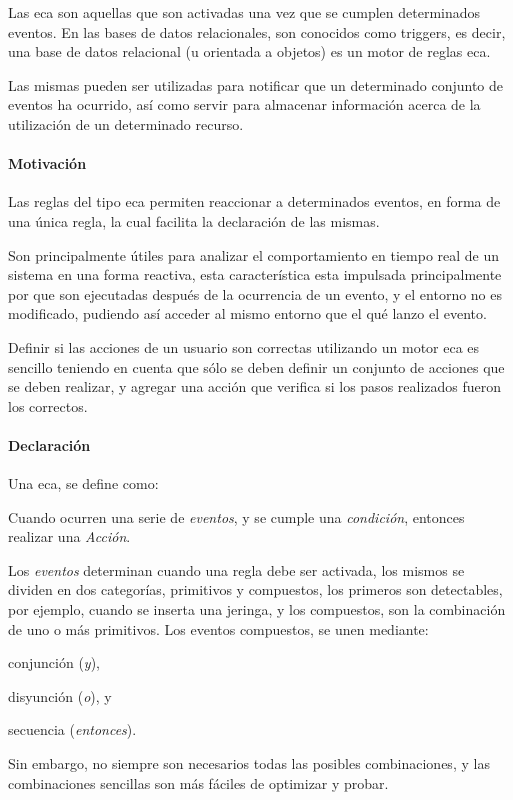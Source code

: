 Las \gls{eca} son aquellas que son activadas una vez que se cumplen determinados
eventos\cite{bailey2004event}. En las bases de datos relacionales, son conocidos
como triggers, es decir, una base de datos relacional (u orientada a objetos) es
un motor de reglas \gls{eca}\cite{bailey2004event,behrends2006combining}.

Las mismas pueden ser utilizadas para notificar que un determinado conjunto de
eventos ha ocurrido\cite{bailey2004event}, así como servir para almacenar
información acerca de la utilización de un determinado recurso.


\paragraph{Motivación}

Las reglas del tipo \gls{eca} permiten reaccionar a determinados eventos, en
forma de una única regla, la cual facilita la declaración de las
mismas\cite{bailey2004event}.

Son principalmente útiles para analizar el comportamiento en tiempo real de un
sistema en una forma
reactiva\cite{bailey2004event,de2001eca,bailey2002analysis}, esta característica
esta impulsada principalmente por que son ejecutadas después de la ocurrencia de
un evento, y el entorno no es modificado, pudiendo así acceder al mismo entorno
que el qué lanzo el evento.

Definir si las acciones de un usuario son correctas utilizando un motor
\gls{eca} es sencillo teniendo en cuenta que sólo se deben definir un
conjunto de acciones que se deben realizar, y agregar una acción que verifica si
los pasos realizados fueron los correctos.

\paragraph{Declaración}

Una \gls{eca}, se define como\cite{bailey2004event,behrends2006combining}:

\begin{displayquote}
	 Cuando ocurren una serie de \emph{eventos}, y se cumple una
	 \emph{condición}, entonces realizar una \emph{Acción}.
\end{displayquote}

Los \emph{eventos} determinan cuando una regla debe ser activada, los mismos se
dividen en dos categorías\cite{behrends2006combining}, primitivos y compuestos,
los primeros son detectables, por ejemplo, cuando se inserta una jeringa, y los
compuestos, son la combinación de uno o más
primitivos\cite{bailey2004event,behrends2006combining}. Los eventos
compuestos, se unen mediante:
\begin{enumerate*}[label=\itshape\alph*\upshape)]
\item conjunción (\emph{y}),
\item disyunción (\emph{o}), y
\item secuencia (\emph{entonces}).
\end{enumerate*}
Sin embargo, no siempre son necesarios todas las posibles combinaciones, y las
combinaciones sencillas son más fáciles de optimizar y
probar\cite{bailey2004event}.

